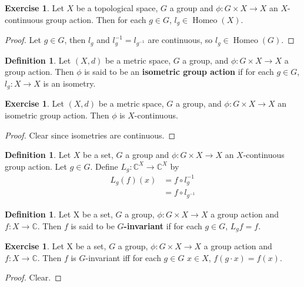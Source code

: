 \documentclass[12pt]{amsart}
\theoremstyle{definition}
\newtheorem{defn}[definition]{Definition}
\newtheorem{ex}[definition]{Exercise}
\newcommand{\C}{\mathbb{C}}
\DeclareMathOperator{\Homeo}{Homeo}
\newcommand{\ld}[1]{\label{defn:#1}}
\begin{document}
	\begin{ex}
	Let $X$ be a topological space, $G$ a group and $\phi: G \times X \rightarrow X$ an $X$-continuous group action. Then for each $g \in G$, $l_g \in \Homeo(X)$.
	\end{ex}
	
	\begin{proof}
	Let $g \in G$, then $l_g$ and $l_{g}^{-1} = l_{g^{-1}}$ are continuous, so $l_g \in \Homeo(G)$. 
	\end{proof}
	
	\begin{defn} \ld{}
	Let $(X, d)$ be a metric space, $G$ a group, and $\phi: G \times X \rightarrow X$ a group action. Then $\phi$ is said to be an \textbf{isometric group action} if for each $g \in G$, $l_g:X \rightarrow X$ is an isometry. 
	\end{defn}
	
	\begin{ex}
	Let $(X, d)$ be a metric space, $G$ a group, and $\phi: G \times X \rightarrow X$ an isometric group action. Then $\phi$ is $X$-continuous.
	\end{ex}
	
	\begin{proof}
	Clear since isometries are continuous.
\end{proof}		
	
	\begin{defn}
	Let $X$ be a set, $G$ a group and $\phi: G \times X \rightarrow X$ an $X$-continuous group action. Let $g \in G$. Define $L_g:\C^X \rightarrow \C^X$ by 
	\begin{align*}
	L_g(f)(x) 
	&= f \circ l_g^{-1} \\
	&= f \circ l_{g^{-1}}
	\end{align*}
	\end{defn}
	
	
	\begin{defn}
	Let X be a set, $G$ a group, $\phi: G \times X \rightarrow X$ a group action and $f:X \rightarrow \C$. Then $f$ is said to be \textbf{$G$-invariant} if for each $g \in G$, $L_g f = f$.
	\end{defn}
	
	\begin{ex}
	Let X be a set, $G$ a group, $\phi: G \times X \rightarrow X$ a group action and $f:X \rightarrow \C$. Then $f$ is $G$-invariant iff for each $g \in G$ $x \in X$, $f(g \cdot x) = f(x)$.  
	\end{ex}
	
	\begin{proof}
	Clear.
	\end{proof}
	
\end{document}
